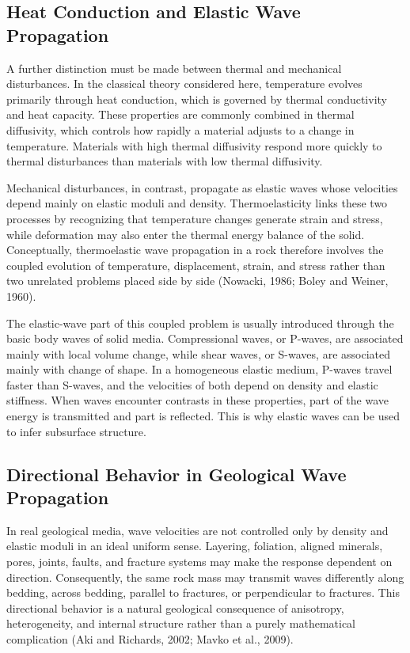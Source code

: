 \documentclass[12pt]{article}
\begin{document}
\subsection{Heat Conduction and Elastic Wave Propagation}

A further distinction must be made between thermal and mechanical disturbances. In the classical theory considered here, temperature evolves primarily through heat conduction, which is governed by thermal conductivity and heat capacity. These properties are commonly combined in thermal diffusivity, which controls how rapidly a material adjusts to a change in temperature. Materials with high thermal diffusivity respond more quickly to thermal disturbances than materials with low thermal diffusivity.

Mechanical disturbances, in contrast, propagate as elastic waves whose velocities depend mainly on elastic moduli and density. Thermoelasticity links these two processes by recognizing that temperature changes generate strain and stress, while deformation may also enter the thermal energy balance of the solid. Conceptually, thermoelastic wave propagation in a rock therefore involves the coupled evolution of temperature, displacement, strain, and stress rather than two unrelated problems placed side by side (Nowacki, 1986; Boley and Weiner, 1960).

The elastic-wave part of this coupled problem is usually introduced through the basic body waves of solid media. Compressional waves, or P-waves, are associated mainly with local volume change, while shear waves, or S-waves, are associated mainly with change of shape. In a homogeneous elastic medium, P-waves travel faster than S-waves, and the velocities of both depend on density and elastic stiffness. When waves encounter contrasts in these properties, part of the wave energy is transmitted and part is reflected. This is why elastic waves can be used to infer subsurface structure.

\subsection{Directional Behavior in Geological Wave Propagation}

In real geological media, wave velocities are not controlled only by density and elastic moduli in an ideal uniform sense. Layering, foliation, aligned minerals, pores, joints, faults, and fracture systems may make the response dependent on direction. Consequently, the same rock mass may transmit waves differently along bedding, across bedding, parallel to fractures, or perpendicular to fractures. This directional behavior is a natural geological consequence of anisotropy, heterogeneity, and internal structure rather than a purely mathematical complication (Aki and Richards, 2002; Mavko et al., 2009).
\end{document}
